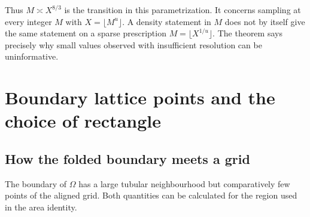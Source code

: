 \documentclass[11pt,a4paper,oneside,openany]{report}
\theoremstyle{remark}\newtheorem{remark}[theorem]{Remark}
\numberwithin{equation}{section}
\begin{document}
Thus $M\asymp X^{8/3}$ is the transition in this parametrization. It concerns sampling at every integer $M$ with $X=\lfloor M^u\rfloor$. A density statement in $M$ does not by itself give the same statement on a sparse prescription $M=\lfloor X^{1/u}\rfloor$. The theorem says precisely why small values observed with insufficient resolution can be uninformative.
\section{Boundary lattice points and the choice of rectangle}\label{ch5:sec:rect}
\subsection{How the folded boundary meets a grid}
The boundary of $\Omega$ has a large tubular neighbourhood but
comparatively few points of the aligned grid. Both quantities can
be calculated for the region used in the area identity.
\end{document}
